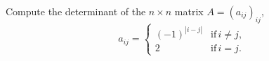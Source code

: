 Compute the determinant of the \(n\times n\) matrix \(A=(a_{ij})_{ij}\),
\[a_{ij}=\begin{cases}
(-1)^{|i-j|} & \text{if}\, i\ne j,\\
2 & \text{if}\, i= j.
\end{cases}\]